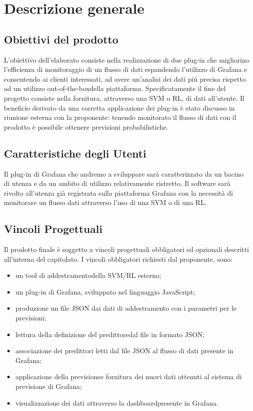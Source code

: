 \section{Descrizione generale}
   
	\subsection{Obiettivi del prodotto}
	L’obiettivo dell’elaborato consiste nella realizzazione di due plug-in che migliorino l’efficienza di monitoraggio di un flusso di dati espandendo l’utilizzo di Grafana e consentendo ai clienti  interessati, ad avere un’analisi dei dati più precisa rispetto ad un utilizzo out-of-the-box\glo della piattaforma. Specificatamente il fine del progetto consiste nella fornitura, attraverso una SVM o RL, di dati all’utente. Il beneficio derivato da una corretta applicazione dei plug-in è stato discusso in riunione esterna con la proponente: tenendo monitorato il flusso di dati con il prodotto è possibile ottenere previsioni probabilistiche. 
	\subsection{Caratteristiche degli Utenti}
	Il plug-in di Grafana che andremo a sviluppare sarà caratterizzato da un bacino di utenza e da un ambito di utilizzo relativamente ristretto.
Il software sarà rivolto all’utenza già registrata sulla piattaforma Grafana con la necessità di monitorare un flusso dati attraverso l’uso di una SVM o di una RL.

	 \subsection{Vincoli Progettuali}
	 Il prodotto finale è soggetto a vincoli progettuali obbligatori ed opzionali descritti all’interno del capitolato. I vincoli obbligatori richiesti dal proponente, sono:

	 	\begin{itemize}
			\item un tool di addestramento\glo della SVM/RL esterno;
	 		\item un plug-in di Grafana, sviluppato nel linguaggio JavaScript;
	 		\item produzione un file JSON dai dati di addestramento con i parametri per le previsioni;
			\item lettura della definizione del predittore\glo dal file in formato JSON;
			\item associazione dei predittori letti dal file JSON al flusso di dati presente in Grafana; 
			\item applicazione della previsione\glo e fornitura dei nuovi dati ottenuti al sistema di previsione di Grafana;
			\item visualizzazione dei dati attraverso la dashboard\glo presente in Grafana.
	 	\end{itemize}

